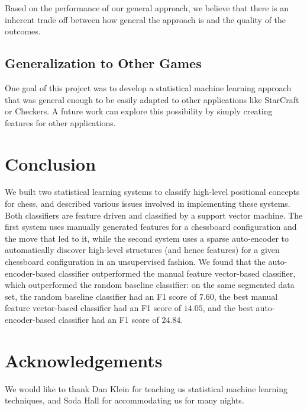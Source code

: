 \documentclass[11pt]{article}
\begin{document}
Based on the performance of our general approach, we believe that there is an inherent trade off between how general the approach is and the quality of the outcomes. 

\subsection{Generalization to Other Games}
One goal of this project was to develop a statistical machine learning approach that was general enough to be easily adapted to other applications like StarCraft or Checkers. A future work can explore this possibility by simply creating features for other applications.

\section{Conclusion}
We built two statistical learning systems to classify high-level positional concepts for chess, and described various issues involved in implementing these systems. Both classifiers are feature driven and classified by a support vector machine. The first system uses manually generated features for a chessboard configuration and the move that led to it, while the second system uses a sparse auto-encoder to automatically discover high-level structures (and hence features) for a given chessboard configuration in an unsupervised fashion. We found that the auto-encoder-based classifier outperformed the manual feature vector-based classifier, which outperformed the random baseline classifier: on the same segmented data set, the random baseline classifier had an F1 score of $\mathbf{7.60}$, the best manual feature vector-based classifier had an F1 score of $\mathbf{14.05}$, and the best auto-encoder-based classifier had an F1 score of $\mathbf{24.84}$.

\section{Acknowledgements}
We would like to thank Dan Klein for teaching us statistical machine learning techniques, and Soda Hall for accommodating us for many nights.



\end{document}
